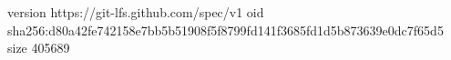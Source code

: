 version https://git-lfs.github.com/spec/v1
oid sha256:d80a42fe742158e7bb5b51908f5f8799fd141f3685fd1d5b873639e0dc7f65d5
size 405689
